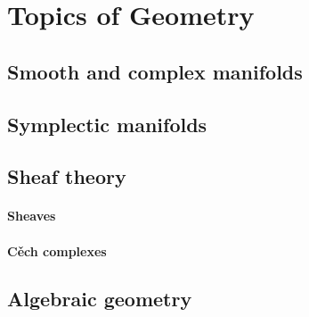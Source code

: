\part{Topics of Geometry}

\chapter{Smooth and complex manifolds}

\chapter{Symplectic manifolds}

\chapter{Sheaf theory}

\subsection{Sheaves}

\subsection{Cěch complexes}



\chapter{Algebraic geometry}


